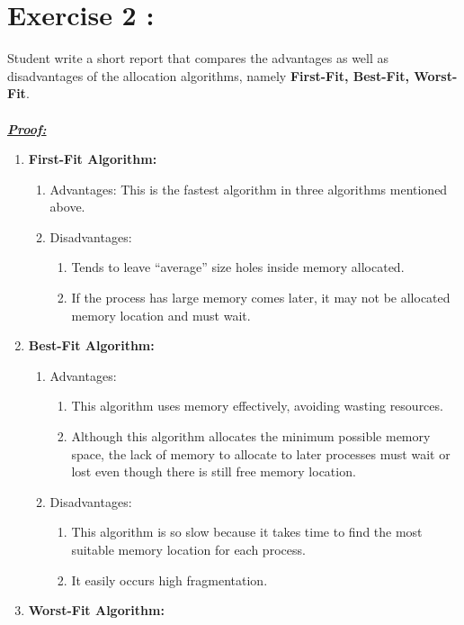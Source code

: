 \documentclass[13pt,a4paper]{article}
\begin{document}
	\section{Exercise 2 :}
		Student write a short report that compares the advantages as well as disadvantages of the allocation algorithms, namely \textbf{First-Fit, Best-Fit, Worst-Fit}.
		\\ \\
		\textit{\underline{\textbf{Proof:}}} 
		\begin{enumerate}[$\ast$]
			\item \textbf{First-Fit Algorithm:}
				\begin{enumerate}[$\bullet$]
					\item Advantages: This is the fastest algorithm in three algorithms mentioned above.
					\item Disadvantages:
						\begin{enumerate}[-]
							\item Tends to leave “average” size holes inside memory allocated.
							\item If the process has large memory comes later, it may not be allocated memory location and must wait.
						\end{enumerate}
				\end{enumerate}
			\item \textbf{Best-Fit Algorithm:}
				\begin{enumerate}[$\bullet$]
					\item Advantages: 
						\begin{enumerate}[-]
							\item This algorithm uses memory effectively, avoiding wasting resources.
							\item Although this algorithm allocates the minimum possible memory space, the lack of memory to allocate to later processes must wait or lost even though there is still free memory location.
						\end{enumerate}
					\item Disadvantages:
						\begin{enumerate}[-]
							\item This algorithm is so slow because it takes time to find the most suitable memory location for each process.
							\item It easily occurs high fragmentation.
						\end{enumerate}
				\end{enumerate}
			\item \textbf{Worst-Fit Algorithm:}

\end{enumerate}
\end{document}
